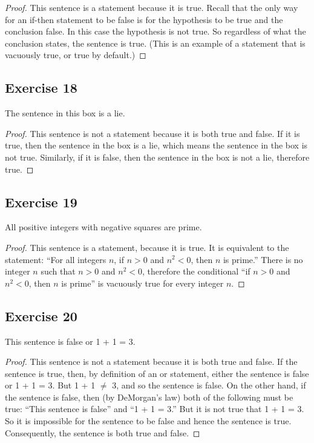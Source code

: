 \documentclass[14pt]{extarticle}
\begin{document}
\begin{proof}
This sentence is a statement because it is true. Recall that the only way for an if-then statement to be false is 
for the hypothesis to be true and the conclusion false. In this case the hypothesis is not true. So regardless of what 
the conclusion states, the sentence is true. (This is an example of a statement that is vacuously true, or true by 
default.)
\end{proof}

\subsection{Exercise 18}
\begin{tcolorbox}[colframe=black]
The sentence in this box is a lie.
\end{tcolorbox}

\begin{proof}
This sentence is not a statement because it is both true and false. If it is true, then the sentence in the box is a 
lie, which means the sentence in the box is not true. Similarly, if it is false, then the sentence in the box is
not a lie, therefore true.
\end{proof}

\subsection{Exercise 19}
All positive integers with negative squares are prime.

\begin{proof}
This sentence is a statement, because it is true. It is equivalent to the statement: ``For all integers $n$, if 
$n > 0$ and $n^2 < 0$, then $n$ is prime.'' There is no integer $n$ such that $n > 0$ and $n^2 < 0$, therefore the
conditional ``if $n > 0$ and $n^2 < 0$, then $n$ is prime'' is vacuously true for every integer $n$.
\end{proof}

\subsection{Exercise 20}
This sentence is false or 1 + 1 = 3.

\begin{proof}
This sentence is not a statement because it is both true and false. If the sentence is true, then, by definition of 
an or statement, either the sentence is false or 1 + 1 = 3. But 1 + 1 $\neq$ 3, and so the sentence is false. On the 
other hand, if the sentence is false, then (by DeMorgan’s law) both of the following must be true: “This sentence is 
false” and “1 + 1 = 3.” But it is not true that 1 + 1 = 3. So it is impossible for the sentence to be false and hence 
the sentence is true. Consequently, the sentence is both true and false.
\end{proof}
\end{document}
